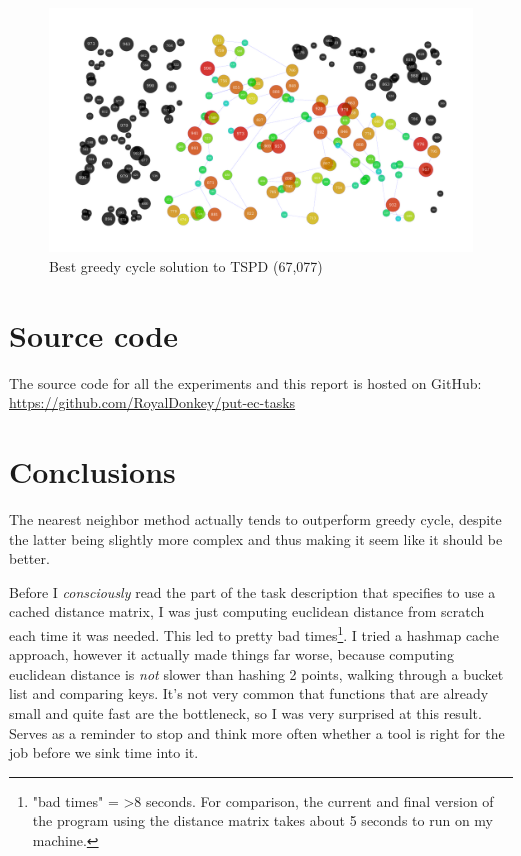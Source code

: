 \documentclass[14pt]{article}
\begin{document}
\begin{figure}[H]
	\begin{adjustwidth}{-3em}{0}
		\includegraphics{results/best_greedy-cycle_TSPD.pdf}
	\end{adjustwidth}
	\vspace{-15mm}
	\caption{Best greedy cycle solution to TSPD (67,077)}
\end{figure}

\section{Source code}
The source code for all the experiments and this report is hosted on GitHub: \\
\url{https://github.com/RoyalDonkey/put-ec-tasks}

\section{Conclusions}
The nearest neighbor method actually tends to outperform greedy cycle, despite
the latter being slightly more complex and thus making it seem like it should
be better.

Before I \emph{consciously} read the part of the task description that
specifies to use a cached distance matrix, I was just computing euclidean
distance from scratch each time it was needed. This led to pretty bad
times\footnote{"bad times" = >8 seconds. For comparison, the current and final
version of the program using the distance matrix takes about 5 seconds to run
on my machine.}. I tried a hashmap cache approach, however it actually made
things far worse, because computing euclidean distance is \emph{not} slower
than hashing 2 points, walking through a bucket list and comparing keys. It's
not very common that functions that are already small and quite fast are the
bottleneck, so I was very surprised at this result. Serves as a reminder to
stop and think more often whether a tool is right for the job before we sink
time into it.
\end{document}
